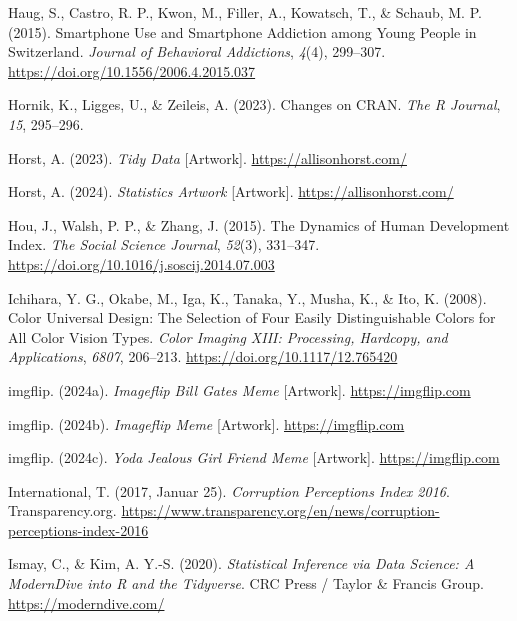 \documentclass[
  letterpaper,
  twoside,
  open=any]{scrbook}
\newlength{\cslhangindent}
\newenvironment{CSLReferences}[2] %
 {\begin{list}{}{%
  \setlength{\itemindent}{0pt}
  \setlength{\leftmargin}{0pt}
  \setlength{\parsep}{0pt}
  \ifodd #1
   \setlength{\leftmargin}{\cslhangindent}
   \setlength{\itemindent}{-1\cslhangindent}
  \fi
  \setlength{\itemsep}{#2\baselineskip}}}
 {\end{list}}
\theoremstyle{definition}
\theoremstyle{definition}
\theoremstyle{definition}
\theoremstyle{remark}
\begin{document}
\begin{CSLReferences}{1}{0}
Haug, S., Castro, R. P., Kwon, M., Filler, A., Kowatsch, T., \& Schaub,
M. P. (2015). Smartphone Use and Smartphone Addiction among Young People
in {Switzerland}. \emph{Journal of Behavioral Addictions}, \emph{4}(4),
299--307. \url{https://doi.org/10.1556/2006.4.2015.037}

Hornik, K., Ligges, U., \& Zeileis, A. (2023). Changes on CRAN.
\emph{The R Journal}, \emph{15}, 295--296.

Horst, A. (2023). \emph{Tidy {Data}} {[}Artwork{]}.
\url{https://allisonhorst.com/}

Horst, A. (2024). \emph{Statistics {Artwork}} {[}Artwork{]}.
\url{https://allisonhorst.com/}

Hou, J., Walsh, P. P., \& Zhang, J. (2015). The Dynamics of {Human
Development Index}. \emph{The Social Science Journal}, \emph{52}(3),
331--347. \url{https://doi.org/10.1016/j.soscij.2014.07.003}

Ichihara, Y. G., Okabe, M., Iga, K., Tanaka, Y., Musha, K., \& Ito, K.
(2008). Color Universal Design: The Selection of Four Easily
Distinguishable Colors for All Color Vision Types. \emph{Color {Imaging
XIII}: {Processing}, {Hardcopy}, and {Applications}}, \emph{6807},
206--213. \url{https://doi.org/10.1117/12.765420}

imgflip. (2024a). \emph{Imageflip {Bill Gates Meme}} {[}Artwork{]}.
\url{https://imgflip.com}

imgflip. (2024b). \emph{Imageflip {Meme}} {[}Artwork{]}.
\url{https://imgflip.com}

imgflip. (2024c). \emph{Yoda {Jealous Girl Friend Meme}} {[}Artwork{]}.
\url{https://imgflip.com}

International, T. (2017, Januar 25). \emph{Corruption {Perceptions
Index} 2016}. Transparency.org.
\url{https://www.transparency.org/en/news/corruption-perceptions-index-2016}

Ismay, C., \& Kim, A. Y.-S. (2020). \emph{Statistical Inference via Data
Science: A {ModernDive} into {R} and the {Tidyverse}}. CRC Press /
Taylor \& Francis Group. \url{https://moderndive.com/}


\end{CSLReferences}
\end{document}

